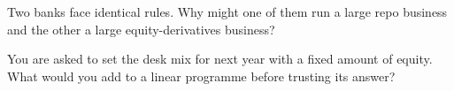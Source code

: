 \begin{interviewq}\label{iq:fm:the-bank-markets-division:5}
Two banks face identical rules. Why might one of them run a large repo business and the other a large equity-derivatives business?
\end{interviewq}

\begin{interviewq}\label{iq:fm:the-bank-markets-division:6}
You are asked to set the desk mix for next year with a fixed amount of equity. What would you add to a linear programme before trusting its
answer?
\end{interviewq}

